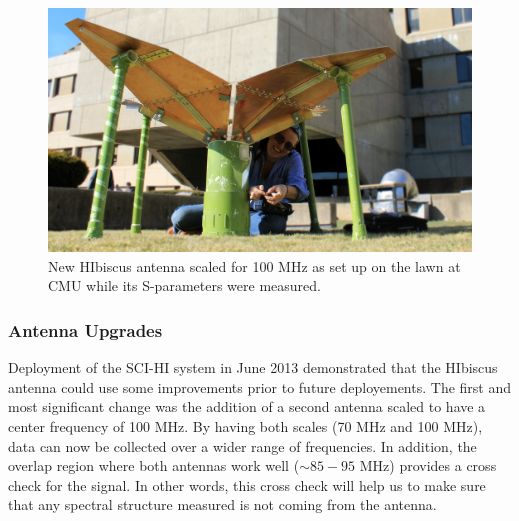 
\begin{figure}[htb]
\begin{center}
\includegraphics[width=0.95\linewidth]{SCIHI_system/figures/HIbiscus_100mhz.jpg}
\caption{New HIbiscus antenna scaled for 100 MHz as set up on the lawn at CMU while its S-parameters were measured. }
\label{Fig:hibiscus_100}
\end{center}
\end{figure}

\subsubsection{Antenna Upgrades} \label{Sec:HIant_upgrade}
Deployment of the SCI-HI system in June 2013 demonstrated that the HIbiscus antenna could use some improvements prior to future deployements. The first and most significant change was the addition of a second antenna scaled to have a center frequency of 100 MHz. By having both scales (70 MHz and 100 MHz), data can now be collected over a wider range of frequencies. In addition, the overlap region where both antennas work well ($\sim 85-95$ MHz) provides a cross check for the signal. In other words, this cross check will help us to make sure that any spectral structure measured is not coming from the antenna. 

